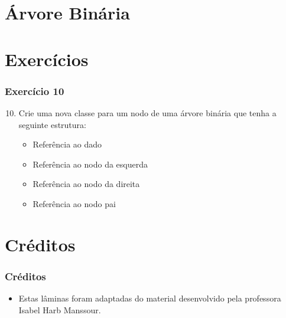 \documentclass[aspectratio=169]{beamer}
\begin{document}
\section{Árvore Binária}

\section{Exercícios}

\begin{frame}[fragile]\frametitle{Exercício 10}
\begin{enumerate}
        \setcounter{enumi}{9}
\item Crie uma nova classe para um nodo de uma árvore binária que tenha a seguinte estrutura:
\begin{itemize}
	\item Referência ao dado\\
	\item Referência ao nodo da esquerda\\
	\item Referência ao nodo da direita\\
	\item Referência ao nodo pai\\
\end{itemize}
\end{enumerate}
\end{frame}

\section{Créditos}

\begin{frame}\frametitle{Créditos}
\begin{itemize}
	\item Estas lâminas foram adaptadas do material desenvolvido pela professora Isabel Harb Manssour.
\end{itemize}
\end{frame}
\end{document}
